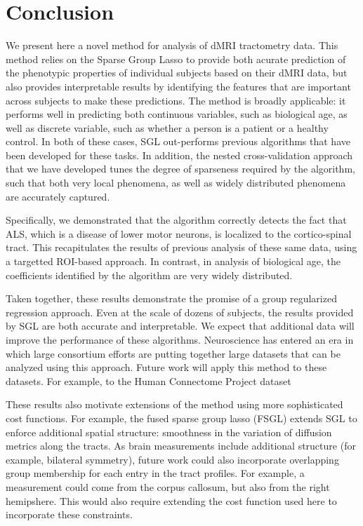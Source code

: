 \section*{Conclusion}

We present here a novel method for analysis of dMRI tractometry data. This
method relies on the Sparse Group Lasso \cite{simon2013sparse} to provide both
acurate prediction of the phenotypic properties of individual subjects based on
their dMRI data, but also provides interpretable results by identifying the
features that are important across subjects to make these predictions. The
method is broadly applicable: it performs well in predicting both continuous
variables, such as biological age, as well as discrete variable, such as whether
a person is a patient or a healthy control. In both of these cases, SGL
out-performs previous algorithms that have been developed for these tasks. In
addition, the nested cross-validation approach that we have developed tunes the
degree of sparseness required by the algorithm, such that both very local
phenomena, as well as widely distributed phenomena are accurately captured.

Specifically, we demonstrated that the algorithm correctly detects the fact that
 ALS, which is a disease of lower motor neurons, is localized to the
 cortico-spinal tract. This recapitulates the results of previous analysis of
 these same data, using a targetted ROI-based approach. In contrast, in analysis
 of biological age, the coefficients identified by the algorithm are very widely
 distributed.

Taken together, these results demonstrate the promise of a group regularized
regression approach. Even at the scale of dozens of subjects, the results
provided by SGL are both accurate and interpretable. We expect that additional
data will improve the performance of these algorithms. Neuroscience has entered
an era in which large consortium efforts are putting together large datasets
that can be analyzed using this approach. Future work will apply this method to
these datasets. For example, to the Human Connectome Project dataset
\cite{VanEssen2012}

These results also motivate extensions of the method using more sophisticated
cost functions. For example, the fused sparse group lasso (FSGL)
\cite{zhou2012} extends SGL to enforce additional spatial structure: smoothness
in the variation of diffusion metrics along the tracts. As brain measurements
include additional structure (for example, bilateral symmetry), future work
could also incorporate overlapping group membership for each entry in the tract
profiles. For example, a measurement could come from the corpus callosum, but
also from the right hemipshere. This would also require extending the cost
function used here to incorporate these constraints.

